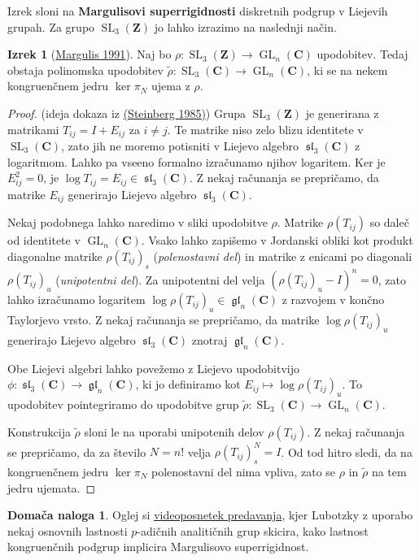 \documentclass[11pt]{book}
\def\ZZ{\mathbf{Z}}
\def\CC{\mathbf{C}}
\DeclareMathOperator\GL{GL}
\DeclareMathOperator\glfrak{\mathfrak{gl}}
\DeclareMathOperator\slfrak{\mathfrak{sl}}
\DeclareMathOperator\SL{SL}
\def\definicija{\color{rdeca}\bf}
\theoremstyle{definition}
\theoremstyle{zgled}
\theoremstyle{zgledbrezstevilke}
\theoremstyle{odprtproblem}
\theoremstyle{domacanaloga}
\newtheorem{domacanaloga}[theorem]{Domača naloga}
\newenvironment{dokaz}
    {\color{siva}\begin{proof}}
    {\end{proof}}
\theoremstyle{izrek}
\newtheorem{izrek}[theorem]{Izrek}
\begin{document}
Izrek sloni na {\definicija Margulisovi superrigidnosti} diskretnih podgrup v Liejevih grupah. Za grupo $\SL_3(\ZZ)$ jo lahko izrazimo na naslednji način.

\begin{izrek}[\href{https://link.springer.com/book/9783642057212}{Margulis 1991}]
Naj bo $\rho \colon \SL_3(\ZZ) \to \GL_n(\CC)$ upodobitev. Tedaj obstaja polinomska upodobitev $\tilde \rho \colon \SL_3(\CC) \to \GL_n(\CC)$, ki se na nekem kongruenčnem jedru $\ker \pi_{N}$ ujema z $\rho$.
\end{izrek}
\begin{dokaz}(ideja dokaza iz \href{https://zbmath.org/?q=an:0579.20038}{(Steinberg 1985)})
Grupa $\SL_3(\ZZ)$ je generirana z matrikami $T_{ij} = I + E_{ij}$ za $i \neq j$. Te matrike niso zelo blizu identitete v $\SL_3(\CC)$, zato jih ne moremo potisniti v Liejevo algebro $\slfrak_3(\CC)$ z logaritmom. Lahko pa vseeno formalno izračunamo njihov logaritem. Ker je $E_{ij}^2 = 0$, je $\log T_{ij} = E_{ij} \in \slfrak_3(\CC)$. Z nekaj računanja se prepričamo, da matrike $E_{ij}$ generirajo  Liejevo algebro $\slfrak_3(\CC)$.

Nekaj podobnega lahko naredimo v sliki upodobitve $\rho$. Matrike $\rho(T_{ij})$ so daleč od identitete v $\GL_n(\CC)$. Vsako lahko zapišemo v Jordanski obliki kot produkt diagonalne matrike $\rho(T_{ij})_s$ (\emph{polenostavni del}) in matrike z enicami po diagonali $\rho(T_{ij})_u$ (\emph{unipotentni del}). Za unipotentni del velja $(\rho(T_{ij})_u - I)^n = 0$, zato lahko izračunamo logaritem $\log \rho(T_{ij})_u \in \glfrak_n(\CC)$ z razvojem v končno Taylorjevo vrsto. Z nekaj računanja se prepričamo, da matrike $\log \rho(T_{ij})_u$ generirajo Liejevo algebro $\slfrak_3(\CC)$ znotraj $\glfrak_n(\CC)$. 

Obe Liejevi algebri lahko povežemo z Liejevo upodobitvijo $\phi \colon \slfrak_3(\CC) \to \glfrak_n(\CC)$, ki jo definiramo kot $E_{ij} \mapsto \log \rho(T_{ij})_u$. To upodobitev pointegriramo do upodobitve grup $\tilde \rho \colon \SL_3(\CC) \to \GL_n(\CC)$. 

Konstrukcija $\tilde \rho$ sloni le na uporabi unipotenih delov $\rho(T_{ij})$. Z nekaj računanja se prepričamo, da za število $N = n!$ velja $\rho(T_{ij})_s^N = I$. Od tod hitro sledi, da na kongruenčnem jedru $\ker \pi_N$ polenostavni del nima vpliva, zato se $\rho$ in $\tilde \rho$ na tem jedru ujemata.
\end{dokaz}

\begin{domacanaloga}
Oglej si \href{http://www.fields.utoronto.ca/talks/congruence-subgroup-problem-and-boundedness-conditions}{videoposnetek predavanja}, kjer Lubotzky z uporabo nekaj osnovnih lastnosti $p$-adičnih analitičnih grup skicira, kako lastnost kongruenčnih podgrup implicira Margulisovo superrigidnost.
\end{domacanaloga}
\end{document}

